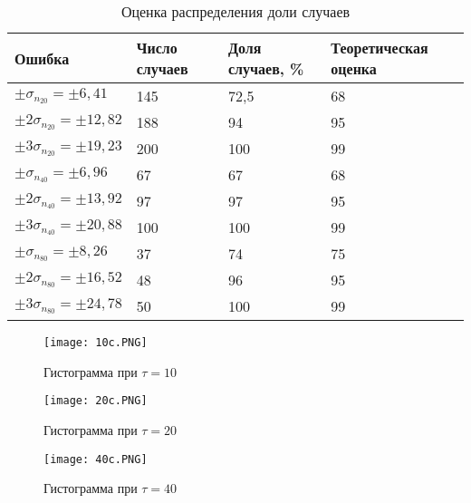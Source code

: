 \documentclass[a4paper]{article}
\begin{document}
\begin{table}[!h]
\begin{center}
\begin{tabular}{|l|l|l|l|}
\hline
Ошибка                             & Число случаев & Доля случаев, \% & Теоретическая оценка \\ \hline
$\pm\sigma_{n_{20}} = \pm 6,41$    & 145           & 72,5             & 68                   \\ \hline
$\pm 2\sigma_{n_{20}} = \pm 12,82$  & 188           & 94               & 95                   \\ \hline
$\pm 3\sigma_{n_{20}} = \pm 19,23$ & 200           & 100              & 99                   \\ \hline
$\pm\sigma_{n_{40}} = \pm 6,96$    & 67            & 67               & 68                   \\ \hline
$\pm 2\sigma_{n_{40}} = \pm 13,92$ & 97            & 97               & 95                   \\ \hline
$\pm 3\sigma_{n_{40}} = \pm 20,88$ & 100           & 100              & 99                   \\ \hline
$\pm\sigma_{n_{80}} = \pm 8,26$    & 37            & 74               & 75                   \\ \hline
$\pm 2\sigma_{n_{80}} = \pm 16,52$ & 48            & 96               & 95                   \\ \hline
$\pm 3\sigma_{n_{80}} = \pm 24,78$ & 50           & 100              & 99                   \\ \hline
\end{tabular}
\caption{Оценка распределения доли случаев}
\end{center}
\end{table}

\begin{figure}[t]
    \centering
    \texttt{[image: 10c.PNG]}
    \caption{Гистограмма при $\tau = 10$}
\end{figure}

\begin{figure}[t]
    \centering
    \texttt{[image: 20c.PNG]}
    \caption{Гистограмма при $\tau = 20$}
\end{figure}

\begin{figure}[t]
    \centering
    \texttt{[image: 40c.PNG]}
    \caption{Гистограмма при $\tau = 40$}
\end{figure}
\end{document}
